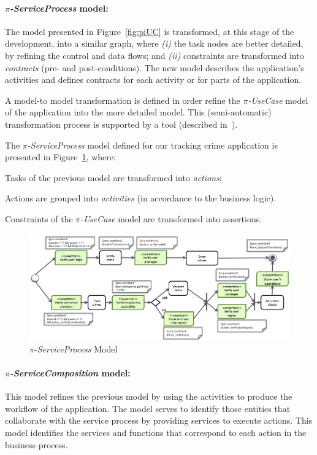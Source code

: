 \paragraph*{\textit{$\pi$-ServiceProcess} model:}
The model presented in Figure~\ref{fig:piUC} is transformed, at this stage of the development, into a similar graph, where \textit{(i)} the task nodes are better detailed, by refining the control and data flows; and \textit{(ii)} constraints are transformed into \textit{contracts} (pre- and post-conditions).
The new model describes the application's activities and defines contracts for each activity or for parts of the application.

A model-to model transformation is defined in order refine the \textit{$\pi$-UseCase} model of the application into the more detailed model. 
This (semi-automatic) transformation process is supported by a tool (described in~\cite{PlacidoThesis2012}).

The \textit{$\pi$-ServiceProcess} model defined for our tracking crime application is presented in Figure~\ref{fig:piSP}, where: 
\begin{numtrivlist}
\item Tasks of the previous model are transformed into \textit{actions};
\item Actions are grouped into \textit{activities} (in accordance to the business logic).
\item Constraints of the \textit{$\pi$-UseCase} model are transformed into assertions.
\end{numtrivlist}

\begin{figure}[t]
\centering
\includegraphics[width=1.05\textwidth]{figs/piServiceProcess}
\caption{$\pi$-\textit{ServiceProcess} Model}
\label{fig:piSP}
\end{figure}

\paragraph*{\textit{$\pi$-ServiceComposition} model:} 
This model refines the previous model by using the activities to produce the workflow of the application.
The model serves to identify those entities that collaborate with the service process by providing services to execute actions. 
This model identifies the services and functions that correspond to each action in the business process.

